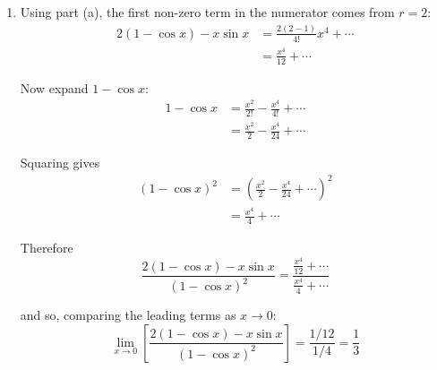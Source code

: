 \documentclass[leqno]{article}
\begin{document}
\begin{enumerate}[
  label=\textbf{\arabic*.},
  leftmargin=*,
  topsep=0pt,
  partopsep=0pt,
  parsep=0pt
]
\begin{djsSolution}
\begin{enumerate}[label=\textbf{(\alph*)}]
Write \(r-1\) in place of \(r\) in this sum, so that it is also in powers of \(x^{2r}\):
\[
x\sin x=\sum_{r=1}^{\infty}(-1)^{r-1}\frac{x^{2r}}{(2r-1)!}
\]

Hence
\[
2(1-\cos x)-x\sin x
=
\sum_{r=1}^{\infty}
\left(
\frac{2(-1)^{r+1}}{(2r)!}
-
\frac{(-1)^{r-1}}{(2r-1)!}
\right)x^{2r}
\]

So the coefficient of \(x^{2r}\) is
\begin{align*}
\frac{2(-1)^{r+1}}{(2r)!}-\frac{(-1)^{r-1}}{(2r-1)!}
&=(-1)^r\left(-\frac{2}{(2r)!}+\frac{1}{(2r-1)!}\right)\\
&=(-1)^r\left(-\frac{2}{(2r)!}+\frac{2r}{(2r)!}\right)\\
&=(-1)^r\frac{2(r-1)}{(2r)!}
\end{align*}

Therefore the general term of the Maclaurin series is
\[
(-1)^r\frac{2(r-1)}{(2r)!}x^{2r}
\]

as required.

  \item Using part (a), the first non-zero term in the numerator comes from \(r=2\):
\begin{align*}
2(1-\cos x)-x\sin x
&=\frac{2(2-1)}{4!}x^4+\cdots\\
&=\frac{x^4}{12}+\cdots
\end{align*}

Now expand \(1-\cos x\):
\begin{align*}
1-\cos x
&=\frac{x^2}{2!}-\frac{x^4}{4!}+\cdots\\
&=\frac{x^2}{2}-\frac{x^4}{24}+\cdots
\end{align*}

Squaring gives
\begin{align*}
(1-\cos x)^2
&=\left(\frac{x^2}{2}-\frac{x^4}{24}+\cdots\right)^2\\
&=\frac{x^4}{4}+\cdots
\end{align*}

Therefore
\[
\frac{2(1-\cos x)-x\sin x}{(1-\cos x)^2}
=
\frac{\frac{x^4}{12}+\cdots}{\frac{x^4}{4}+\cdots}
\]

and so, comparing the leading terms as \(x\to 0\):
\[
\lim_{x\to 0}\left[\frac{2(1-\cos x)-x\sin x}{(1-\cos x)^2}\right]
=
\frac{1/12}{1/4}
=
\frac13
\]
\end{enumerate}
\end{djsSolution}


\newpage

\questionitem


\end{enumerate}
\end{document}
